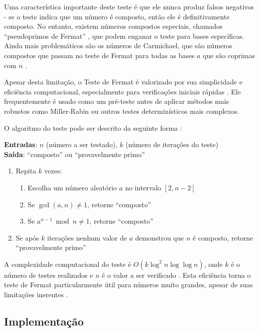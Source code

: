 Uma característica importante deste teste é que ele nunca produz falsos negativos - se o teste indica que um número é composto, então ele é definitivamente composto. No entanto, existem números compostos especiais, chamados ``pseudoprimos de Fermat'' \cite{pomerance1980pseudoprimes, ribenboim1995new}, que podem enganar o teste para bases específicas. Ainda mais problemáticos são os números de Carmichael, que são números compostos que passam no teste de Fermat para todas as bases $a$ que são coprimas com $n$ \cite{alford1994infinitely, pinch1993carmichael}.

Apesar desta limitação, o Teste de Fermat é valorizado por sua simplicidade e eficiência computacional, especialmente para verificações iniciais rápidas \cite{ribenboim1995new}. Ele frequentemente é usado como um pré-teste antes de aplicar métodos mais robustos como Miller-Rabin ou outros testes determinísticos mais complexos.

O algoritmo do teste pode ser descrito da seguinte forma \cite{cohen1993course}:

\textbf{Entradas}: $n$ (número a ser testado), $k$ (número de iterações do teste)\\
\textbf{Saída}: ``composto'' ou ``provavelmente primo''

\begin{enumerate}
    \item Repita $k$ vezes:
    \begin{enumerate}
        \item Escolha um número aleatório $a$ no intervalo $[2, n-2]$
        \item Se $\gcd(a, n) \neq 1$, retorne ``composto''
        \item Se $a^{n-1} \bmod n \neq 1$, retorne ``composto''
    \end{enumerate}
    \item Se após $k$ iterações nenhum valor de $a$ demonstrou que $n$ é composto, retorne ``provavelmente primo''
\end{enumerate}

A complexidade computacional do teste é $O(k \log^2 n \log \log n)$, onde $k$ é o número de testes realizados e $n$ é o valor a ser verificado \cite{cormen2009introduction}. Esta eficiência torna o teste de Fermat particularmente útil para números muito grandes, apesar de suas limitações inerentes \cite{cormen2009introduction}.

\subsection{Implementação}

